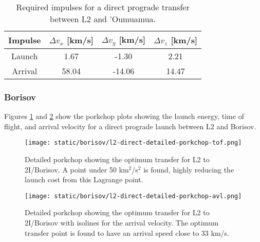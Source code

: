 \vspace{1cm}
\begin{table}[H]
  \centering
  \begin{tabular}{|c|c|c|c|}
    \hline
    Impulse & $\Delta v_x$ [km/s] & $\Delta v_y$ [km/s] & $\Delta v_z$ [km/s] \\
    \hline
    Launch  & 1.67                & -1.30               & 2.21                \\
    \hline
    Arrival & 58.04               & -14.06              & 14.47               \\
    \hline
  \end{tabular}
  \caption[Required impulses for a direct prograde transfer between L2 and
    'Oumuamua]{Required impulses for a direct prograde transfer between L2 and
    'Oumuamua.}
  \label{tab:l2-oumuamua-direct-transfer-impulses}
\end{table}


\subsubsection{Borisov}

Figures \ref{fig:l2-borisov-optimum-porkchop} and
\ref{fig:l2-borisov-optimum-porkchop-avl} show the porkchop plots showing the
launch energy, time of flight, and arrival velocity for a direct prograde launch
between L2 and Borisov.

\begin{figure}[H]
  \centering
  \texttt{[image: static/borisov/l2-direct-detailed-porkchop-tof.png]}
  \caption[Detailed porkchop showing the optimum transfer for
    L2 to 2I/Borisov with the time of flight.]{Detailed porkchop showing the optimum transfer for
    L2 to 2I/Borisov. A point under 50 km$^2$/s$^2$ is found, highly
    reducing the launch cost from this Lagrange point.
  }
  \label{fig:l2-borisov-optimum-porkchop}
\end{figure}

\begin{figure}[H]
  \centering
  \texttt{[image: static/borisov/l2-direct-detailed-porkchop-avl.png]}
  \caption[Detailed porkchop showing the optimum transfer for
    L2 to 2I/Borisov with the arrival velocity.]{Detailed porkchop showing the
    optimum transfer for L2 to 2I/Borisov with isolines for the arrival
    velocity. The optimum transfer point is found to have an arrival speed
    close to 33 km/s.}
  \label{fig:l2-borisov-optimum-porkchop-avl}
\end{figure}

